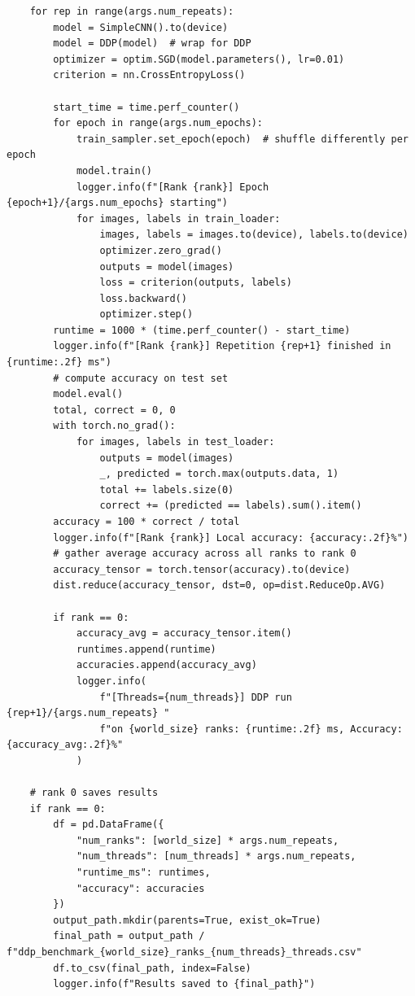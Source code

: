 \documentclass{article}
\begin{document}
\begin{lstlisting}
    for rep in range(args.num_repeats):
        model = SimpleCNN().to(device)
        model = DDP(model)  # wrap for DDP
        optimizer = optim.SGD(model.parameters(), lr=0.01)
        criterion = nn.CrossEntropyLoss()

        start_time = time.perf_counter()
        for epoch in range(args.num_epochs):
            train_sampler.set_epoch(epoch)  # shuffle differently per epoch
            model.train()
            logger.info(f"[Rank {rank}] Epoch {epoch+1}/{args.num_epochs} starting")
            for images, labels in train_loader:
                images, labels = images.to(device), labels.to(device)
                optimizer.zero_grad()
                outputs = model(images)
                loss = criterion(outputs, labels)
                loss.backward()
                optimizer.step()
        runtime = 1000 * (time.perf_counter() - start_time)
        logger.info(f"[Rank {rank}] Repetition {rep+1} finished in {runtime:.2f} ms")
        # compute accuracy on test set
        model.eval()
        total, correct = 0, 0
        with torch.no_grad():
            for images, labels in test_loader:
                outputs = model(images)
                _, predicted = torch.max(outputs.data, 1)
                total += labels.size(0)
                correct += (predicted == labels).sum().item()
        accuracy = 100 * correct / total
        logger.info(f"[Rank {rank}] Local accuracy: {accuracy:.2f}%")
        # gather average accuracy across all ranks to rank 0
        accuracy_tensor = torch.tensor(accuracy).to(device)
        dist.reduce(accuracy_tensor, dst=0, op=dist.ReduceOp.AVG)

        if rank == 0:
            accuracy_avg = accuracy_tensor.item()
            runtimes.append(runtime)
            accuracies.append(accuracy_avg)
            logger.info(
                f"[Threads={num_threads}] DDP run {rep+1}/{args.num_repeats} "
                f"on {world_size} ranks: {runtime:.2f} ms, Accuracy: {accuracy_avg:.2f}%"
            )

    # rank 0 saves results
    if rank == 0:
        df = pd.DataFrame({
            "num_ranks": [world_size] * args.num_repeats,
            "num_threads": [num_threads] * args.num_repeats,
            "runtime_ms": runtimes,
            "accuracy": accuracies
        })
        output_path.mkdir(parents=True, exist_ok=True)
        final_path = output_path / f"ddp_benchmark_{world_size}_ranks_{num_threads}_threads.csv"
        df.to_csv(final_path, index=False)
        logger.info(f"Results saved to {final_path}")


\end{lstlisting}
\end{document}
